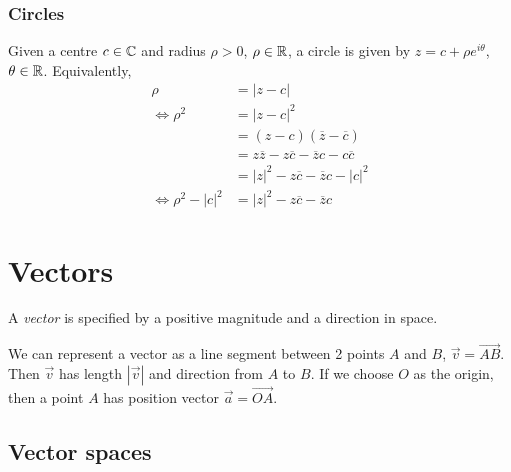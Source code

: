 \documentclass{../template/note}
\begin{document}
    \subsubsection{Circles}

    Given a centre \(c \in \mathbb C\) and radius \(\rho > 0\), \(\rho \in \mathbb R\), a circle is given by \(z = c + \rho e^{i \theta}\), \(\theta \in \mathbb R\). Equivalently, 
    \begin{align*}
        \rho&=|z-c|\\
        \iff\rho^2&=|z-c|^2\\
        &= (z-c)(\overline{z}-\overline{c})\\
        &= z\overline{z}-z\overline{c}-\overline{z}c-c\overline{c} \\
        &= |z|^2-z\overline{c}-\overline{z}c-|c|^2\\
        \iff\rho^2-|c|^2&=|z|^2-z\overline{c}-\overline{z}c
    \end{align*}

    
    \section{Vectors}

    \begin{definition}
        A \emph{vector} is specified by a positive magnitude and a direction in space.

        We can represent a vector as a line segment between 2 points \(A\) and \(B\), \(\vec v = \overrightarrow{AB}\). Then \(\vec v\) has length \(|\vec v|\) and direction from \(A\) to \(B\). If we choose \(O\) as the origin, then a point \(A\) has position vector \(\vec a = \overrightarrow{OA}\).
    \end{definition}

    \subsection{Vector spaces}
    
\end{document}
